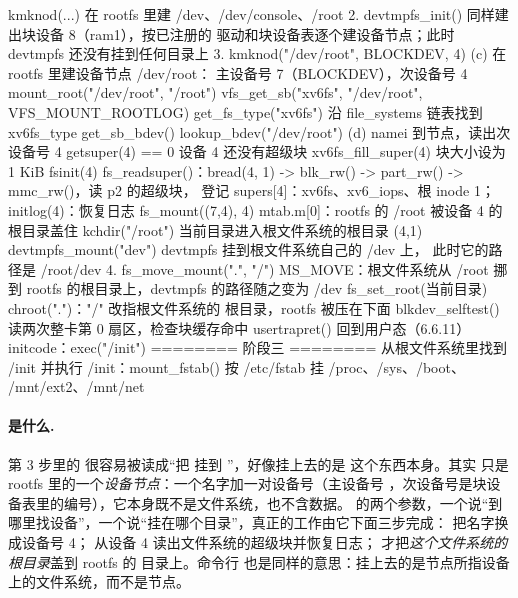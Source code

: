 \begin{txtcode}
       kmknod(...)                     在 rootfs 里建 /dev、/dev/console、/root
    2. devtmpfs_init()                 同样建出块设备 8（ram1），按已注册的
                                       驱动和块设备表逐个建设备节点；此时
                                       devtmpfs 还没有挂到任何目录上
    3. kmknod("/dev/root", BLOCKDEV, 4)
                                  (c)  在 rootfs 里建设备节点 /dev/root：
                                       主设备号 7（BLOCKDEV），次设备号 4
       mount_root("/dev/root", "/root")
         vfs_get_sb("xv6fs", "/dev/root", VFS_MOUNT_ROOTLOG)
           get_fs_type("xv6fs")        沿 file_systems 链表找到 xv6fs_type
           get_sb_bdev()
             lookup_bdev("/dev/root")
                                  (d)  namei 到节点，读出次设备号 4
             getsuper(4) == 0          设备 4 还没有超级块
             xv6fs_fill_super(4)       块大小设为 1 KiB
               fsinit(4)               fs_readsuper()：bread(4, 1) -> blk_rw()
                                       -> part_rw() -> mmc_rw()，读 p2 的超级块，
                                       登记 supers[4]：xv6fs、xv6_iops、根 inode 1；
                                       initlog(4)：恢复日志
         fs_mount((7,4), 4)            mtab.m[0]：rootfs 的 /root 被设备 4 的
                                       根目录盖住
       kchdir("/root")                 当前目录进入根文件系统的根目录 (4,1)
       devtmpfs_mount("dev")           devtmpfs 挂到根文件系统自己的 /dev 上，
                                       此时它的路径是 /root/dev
    4. fs_move_mount(".", "/")         MS_MOVE：根文件系统从 /root 挪到 rootfs
                                       的根目录上，devtmpfs 的路径随之变为 /dev
       fs_set_root(当前目录)           chroot(".")："/" 改指根文件系统的
                                       根目录，rootfs 被压在下面
  blkdev_selftest()                    读两次整卡第 0 扇区，检查块缓存命中
  usertrapret()                        回到用户态（6.6.11）
initcode：exec("/init")                ======== 阶段三 ========
                                       从根文件系统里找到 /init 并执行
  /init：mount_fstab()                 按 /etc/fstab 挂 /proc、/sys、/boot、
                                       /mnt/ext2、/mnt/net
\end{txtcode}

\paragraph{ 是什么.} 第 3 步里的  很容易被读成“把  挂到 ”，好像挂上去的是  这个东西本身。其实  只是 rootfs 里的一个\emph{设备节点}：一个名字加一对设备号（主设备号 ，次设备号是块设备表里的编号），它本身既不是文件系统，也不含数据。 的两个参数，一个说“到哪里找设备”，一个说“挂在哪个目录”，真正的工作由它下面三步完成： 把名字换成设备号 4； 从设备 4 读出文件系统的超级块并恢复日志； 才把\emph{这个文件系统的根目录}盖到 rootfs 的  目录上。命令行  也是同样的意思：挂上去的是节点所指设备上的文件系统，而不是节点。

